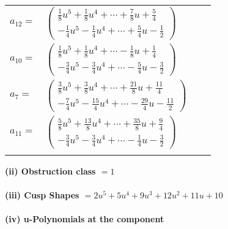 \documentclass[1p]{elsarticle_modified}
\theoremstyle{definition}
\begin{document}
\begin{tabular}{m{7pt} m{180pt} m{7pt} m{180pt} }
\flushright $a_{12}=$&$\begin{pmatrix}\frac{1}{8} u^5+\frac{1}{8} u^4+\cdots+\frac{7}{8} u+\frac{5}{4}\\-\frac{1}{4} u^5-\frac{1}{4} u^4+\cdots+\frac{5}{4} u-\frac{1}{2}\end{pmatrix}$ \\
\flushright $a_{10}=$&$\begin{pmatrix}\frac{1}{8} u^5+\frac{1}{8} u^4+\cdots-\frac{1}{8} u+\frac{1}{4}\\-\frac{3}{4} u^5-\frac{3}{4} u^4+\cdots-\frac{5}{4} u-\frac{3}{2}\end{pmatrix}$ \\
\flushright $a_{7}=$&$\begin{pmatrix}\frac{3}{8} u^5+\frac{3}{8} u^4+\cdots+\frac{21}{8} u+\frac{11}{4}\\-\frac{7}{4} u^5-\frac{15}{4} u^4+\cdots-\frac{29}{4} u-\frac{11}{2}\end{pmatrix}$ \\
\flushright $a_{11}=$&$\begin{pmatrix}\frac{5}{8} u^5+\frac{13}{8} u^4+\cdots+\frac{35}{8} u+\frac{9}{4}\\-\frac{3}{4} u^5-\frac{3}{4} u^4+\cdots-\frac{1}{4} u-\frac{3}{2}\end{pmatrix}$\\&\end{tabular}
\flushleft \textbf{(ii) Obstruction class $= 1$}\\~\\
\flushleft \textbf{(iii) Cusp Shapes $= 2 u^5+5 u^4+9 u^3+12 u^2+11 u+10$}\\~\\
\newpage\renewcommand{\arraystretch}{1}
\flushleft \textbf{(iv) u-Polynomials at the component}\newline \\
\end{document}
